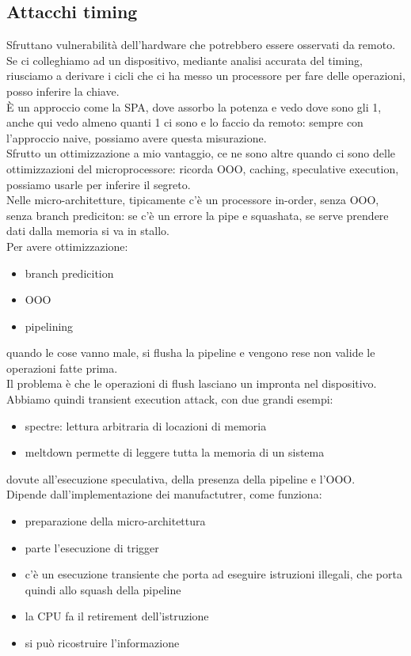 \documentclass[oneside, 12pt]{extbook}
\begin{document}
\subsection{Attacchi timing}
Sfruttano vulnerabilità dell'hardware che potrebbero essere osservati da remoto.\\Se ci colleghiamo ad un dispositivo, mediante analisi accurata del timing, riusciamo a derivare i cicli che ci ha messo un processore per fare delle operazioni, posso inferire la chiave.\\È un approccio come la SPA, dove assorbo la potenza e vedo dove sono gli 1, anche qui vedo almeno quanti 1 ci sono e lo faccio da remoto: sempre con l'approccio naive, possiamo avere questa misurazione.\\Sfrutto un ottimizzazione a mio vantaggio, ce ne sono altre quando ci sono delle ottimizzazioni del microprocessore: ricorda OOO, caching, speculative execution, possiamo usarle per inferire il segreto.\\Nelle micro-architetture, tipicamente c'è un processore in-order, senza OOO, senza branch prediciton: se c'è un errore la pipe e squashata, se serve prendere dati dalla memoria si va in stallo.\\Per avere ottimizzazione:
\begin{itemize}
	\item branch predicition
	\item OOO
	\item pipelining
\end{itemize}
quando le cose vanno male, si flusha la pipeline e vengono rese non valide le operazioni fatte prima.\\Il problema è che le operazioni di flush lasciano un impronta nel dispositivo. Abbiamo quindi transient execution attack, con due grandi esempi:
\begin{itemize}
	\item spectre: lettura arbitraria di locazioni di memoria
	\item meltdown permette di leggere tutta la memoria di un sistema
\end{itemize}
dovute all'esecuzione speculativa, della presenza della pipeline e l'OOO.\\Dipende dall'implementazione dei manufactutrer, come funziona:
\begin{itemize}
	\item preparazione della micro-architettura
	\item parte l'esecuzione di trigger
	\item c'è un esecuzione transiente che porta ad eseguire istruzioni illegali, che porta quindi allo squash della pipeline
	\item la CPU fa il retirement dell'istruzione
	\item si può ricostruire l'informazione
\end{itemize}
\end{document}
